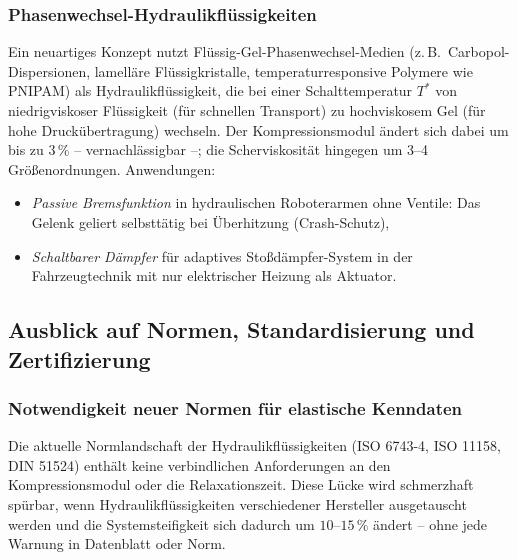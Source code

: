﻿\documentclass[a4paper,12pt]{scrreprt}
\theoremstyle{definition}
\begin{document}
\subsubsection{Phasenwechsel-Hydraulikflüssigkeiten}

Ein neuartiges Konzept nutzt Flüssig-Gel-Phasenwechsel-Medien
(z.\,B.\ Carbopol-Disper\-sionen, lamelläre Flüssigkristalle,
temperaturresponsive Polymere wie PNIPAM) als Hydraulikflüssigkeit,
die bei einer Schalttemperatur $T^*$ von niedrigviskoser Flüssigkeit
(für schnellen Transport) zu hochviskosem Gel (für hohe Druck\-übertragung)
wechseln. Der Kompressionsmodul ändert sich dabei um bis zu
$3\,\%$ -- vernachlässigbar --; die Scherviskosität hingegen um
3--4 Größenordnungen. Anwendungen:
\begin{itemize}
  \item \emph{Passive Bremsfunktion} in hydraulischen Roboterarmen
    ohne Ventile: Das Gelenk geliert selbsttätig bei Überhitzung
    (Crash-Schutz),
  \item \emph{Schaltbarer Dämpfer} für adaptives Stoßdämpfer-System
    in der Fahrzeugtechnik mit nur elektrischer Heizung als Aktuator.
\end{itemize}

\subsection{Ausblick auf Normen, Standardisierung und Zertifizierung}

\subsubsection{Notwendigkeit neuer Normen für elastische Kenndaten}

Die aktuelle Normlandschaft der Hydraulikflüssigkeiten (ISO 6743-4,
ISO 11158, DIN 51524) enthält keine verbindlichen Anforderungen an
den Kompressionsmodul oder die Relaxationszeit. Diese Lücke wird
schmerzhaft spürbar, wenn Hydraulikflüssigkeiten verschiedener
Hersteller ausgetauscht werden und die Systemsteifigkeit sich dadurch
um $10$--$15\,\%$ ändert -- ohne jede Warnung in Datenblatt oder Norm.
\end{document}
